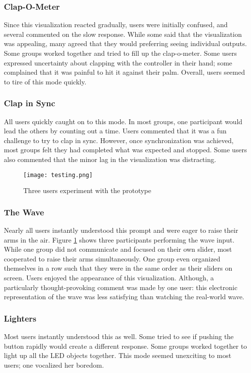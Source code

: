 \subsubsection{Clap-O-Meter}
Since this visualization reacted gradually, users were initially confused, and several commented on the slow response. While some said that the visualization was appealing, many agreed that they would preferring seeing individual outputs. Some groups worked together and tried to fill up the clap-o-meter. Some users expressed uncertainty about clapping with the controller in their hand; some complained that it was painful to hit it against their palm. Overall, users seemed to tire of this mode quickly.

\subsubsection{Clap in Sync}
All users quickly caught on to this mode. In most groups, one participant would lead the others by counting out a time. Users commented that it was a fun challenge to try to clap in sync. However, once synchronization was achieved, most groups felt they had completed what was expected and stopped. Some users also commented that the minor lag in the visualization was distracting.

\begin{figure}
	\centering

	\texttt{[image: testing.png]}
	\caption{Three users experiment with the prototype}

	\label{prototyping2.5}
\end{figure}

\subsubsection{The Wave}
Nearly all users instantly understood this prompt and were eager to raise their arms in the air. Figure \ref{prototyping2.5} shows three participants performing the wave input. While one group did not communicate and focused on their own slider, most cooperated to raise their arms simultaneously. One group even organized themselves in a row such that they were in the same order as their sliders on screen. Users enjoyed the appearance of this visualization. Although, a particularly thought-provoking comment was made by one user: this electronic representation of the wave was less satisfying than watching the real-world wave.

\subsubsection{Lighters}
Most users instantly understood this as well. Some tried to see if pushing the button rapidly would create a different response. Some groups worked together to light up all the LED objects together. This mode seemed unexciting to most users; one vocalized her boredom.

